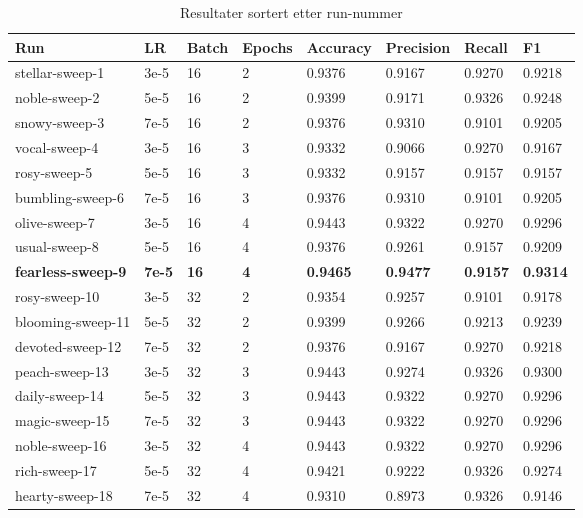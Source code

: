 \begin{table}
\caption{Resultater sortert etter run-nummer}
\label{tab:results}
\begin{tabular}{llllllll}
\toprule
Run & LR & Batch & Epochs & Accuracy & Precision & Recall & F1 \\
\midrule
stellar-sweep-1 & 3e-5 & 16 & 2 & 0.9376 & 0.9167 & 0.9270 & 0.9218 \\
noble-sweep-2 & 5e-5 & 16 & 2 & 0.9399 & 0.9171 & 0.9326 & 0.9248 \\
snowy-sweep-3 & 7e-5 & 16 & 2 & 0.9376 & 0.9310 & 0.9101 & 0.9205 \\
vocal-sweep-4 & 3e-5 & 16 & 3 & 0.9332 & 0.9066 & 0.9270 & 0.9167 \\
rosy-sweep-5 & 5e-5 & 16 & 3 & 0.9332 & 0.9157 & 0.9157 & 0.9157 \\
bumbling-sweep-6 & 7e-5 & 16 & 3 & 0.9376 & 0.9310 & 0.9101 & 0.9205 \\
olive-sweep-7 & 3e-5 & 16 & 4 & 0.9443 & 0.9322 & 0.9270 & 0.9296 \\
usual-sweep-8 & 5e-5 & 16 & 4 & 0.9376 & 0.9261 & 0.9157 & 0.9209 \\
\textbf{fearless-sweep-9} & \textbf{7e-5} & \textbf{16} & \textbf{4} & \textbf{0.9465} & \textbf{0.9477} & \textbf{0.9157} & \textbf{0.9314} \\
rosy-sweep-10 & 3e-5 & 32 & 2 & 0.9354 & 0.9257 & 0.9101 & 0.9178 \\
blooming-sweep-11 & 5e-5 & 32 & 2 & 0.9399 & 0.9266 & 0.9213 & 0.9239 \\
devoted-sweep-12 & 7e-5 & 32 & 2 & 0.9376 & 0.9167 & 0.9270 & 0.9218 \\
peach-sweep-13 & 3e-5 & 32 & 3 & 0.9443 & 0.9274 & 0.9326 & 0.9300 \\
daily-sweep-14 & 5e-5 & 32 & 3 & 0.9443 & 0.9322 & 0.9270 & 0.9296 \\
magic-sweep-15 & 7e-5 & 32 & 3 & 0.9443 & 0.9322 & 0.9270 & 0.9296 \\
noble-sweep-16 & 3e-5 & 32 & 4 & 0.9443 & 0.9322 & 0.9270 & 0.9296 \\
rich-sweep-17 & 5e-5 & 32 & 4 & 0.9421 & 0.9222 & 0.9326 & 0.9274 \\
hearty-sweep-18 & 7e-5 & 32 & 4 & 0.9310 & 0.8973 & 0.9326 & 0.9146 \\
\bottomrule
\end{tabular}
\end{table}
